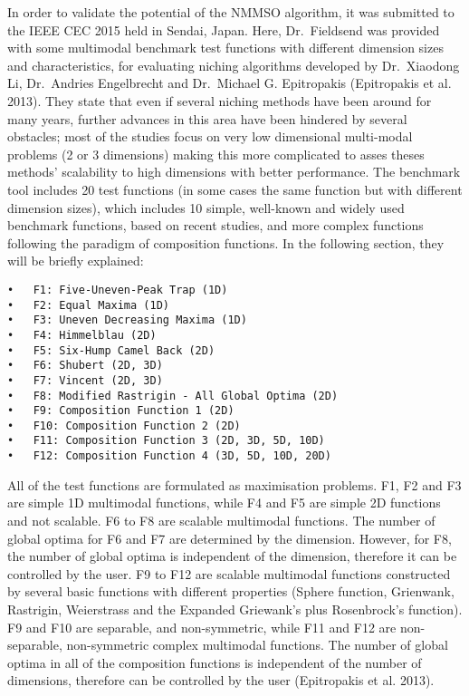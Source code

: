 \documentclass[12pt,a4paper]{article}
\begin{document}
In order to validate the potential of the NMMSO algorithm, it was
submitted to the IEEE CEC 2015 held in Sendai, Japan. Here,
Dr.~Fieldsend was provided with some multimodal benchmark test functions
with different dimension sizes and characteristics, for evaluating
niching algorithms developed by Dr.~Xiaodong Li, Dr.~Andries Engelbrecht
and Dr.~Michael G. Epitropakis (Epitropakis et al. 2013). They state
that even if several niching methods have been around for many years,
further advances in this area have been hindered by several obstacles;
most of the studies focus on very low dimensional multi-modal problems
(2 or 3 dimensions) making this more complicated to asses theses
methods' scalability to high dimensions with better performance. The
benchmark tool includes 20 test functions (in some cases the same
function but with different dimension sizes), which includes 10 simple,
well-known and widely used benchmark functions, based on recent studies,
and more complex functions following the paradigm of composition
functions. In the following section, they will be briefly explained:

\begin{verbatim}
•   F1: Five-Uneven-Peak Trap (1D)
•   F2: Equal Maxima (1D)
•   F3: Uneven Decreasing Maxima (1D)
•   F4: Himmelblau (2D)
•   F5: Six-Hump Camel Back (2D)
•   F6: Shubert (2D, 3D)
•   F7: Vincent (2D, 3D)
•   F8: Modified Rastrigin - All Global Optima (2D)
•   F9: Composition Function 1 (2D)
•   F10: Composition Function 2 (2D)
•   F11: Composition Function 3 (2D, 3D, 5D, 10D)
•   F12: Composition Function 4 (3D, 5D, 10D, 20D)
\end{verbatim}

All of the test functions are formulated as maximisation problems. F1,
F2 and F3 are simple 1D multimodal functions, while F4 and F5 are simple
2D functions and not scalable. F6 to F8 are scalable multimodal
functions. The number of global optima for F6 and F7 are determined by
the dimension. However, for F8, the number of global optima is
independent of the dimension, therefore it can be controlled by the
user. F9 to F12 are scalable multimodal functions constructed by several
basic functions with different properties (Sphere function, Grienwank,
Rastrigin, Weierstrass and the Expanded Griewank's plus Rosenbrock's
function). F9 and F10 are separable, and non-symmetric, while F11 and
F12 are non-separable, non-symmetric complex multimodal functions. The
number of global optima in all of the composition functions is
independent of the number of dimensions, therefore can be controlled by
the user (Epitropakis et al. 2013).
\end{document}
